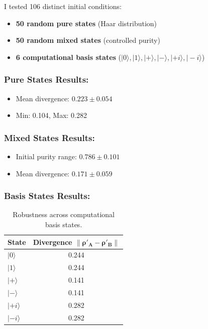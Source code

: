 \documentclass[11pt, onecolumn, letterpaper]{article}
\begin{document}
I tested 106 distinct initial conditions:
\begin{itemize}
    \item \textbf{50 random pure states} (Haar distribution)
    \item \textbf{50 random mixed states} (controlled purity)
    \item \textbf{6 computational basis states} ($|0\rangle, |1\rangle, |+\rangle, |-\rangle, |+i\rangle, |-i\rangle$)
\end{itemize}

\subsubsection*{Pure States Results:}
\begin{itemize}
    \item Mean divergence: $0.223 \pm 0.054$
    \item Min: 0.104, Max: 0.282
\end{itemize}

\subsubsection*{Mixed States Results:}
\begin{itemize}
    \item Initial purity range: $0.786 \pm 0.101$
    \item Mean divergence: $0.171 \pm 0.059$
\end{itemize}

\subsubsection*{Basis States Results:}
\begin{table}[h!]
\centering
\begin{tabular}{l c}
\toprule
\textbf{State} & \textbf{Divergence $\boldsymbol{\|\rho'_A - \rho'_B\|}$} \\
\midrule
$|0\rangle$ & 0.244 \\
$|1\rangle$ & 0.244 \\
$|+\rangle$ & 0.141 \\
$|-\rangle$ & 0.141 \\
$|+i\rangle$ & 0.282 \\
$|-i\rangle$ & 0.282 \\
\bottomrule
\end{tabular}
\caption{Robustness across computational basis states.}
\label{tab:basis_states}
\end{table}
\end{document}

